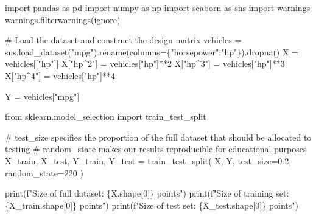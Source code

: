 \documentclass[
  letterpaper,
  DIV=11,
  numbers=noendperiod]{scrreprt}
\newenvironment{Shaded}{\begin{snugshade}}{\end{snugshade}}
\newcommand{\BuiltInTok}[1]{\textcolor[rgb]{0.00,0.23,0.31}{#1}}
\newcommand{\CommentTok}[1]{\textcolor[rgb]{0.37,0.37,0.37}{#1}}
\newcommand{\DecValTok}[1]{\textcolor[rgb]{0.68,0.00,0.00}{#1}}
\newcommand{\FloatTok}[1]{\textcolor[rgb]{0.68,0.00,0.00}{#1}}
\newcommand{\ImportTok}[1]{\textcolor[rgb]{0.00,0.46,0.62}{#1}}
\newcommand{\NormalTok}[1]{\textcolor[rgb]{0.00,0.23,0.31}{#1}}
\newcommand{\OperatorTok}[1]{\textcolor[rgb]{0.37,0.37,0.37}{#1}}
\newcommand{\SpecialCharTok}[1]{\textcolor[rgb]{0.37,0.37,0.37}{#1}}
\newcommand{\SpecialStringTok}[1]{\textcolor[rgb]{0.13,0.47,0.30}{#1}}
\newcommand{\StringTok}[1]{\textcolor[rgb]{0.13,0.47,0.30}{#1}}
\begin{document}
\begin{Shaded}
\begin{Highlighting}[]
\ImportTok{import}\NormalTok{ pandas }\ImportTok{as}\NormalTok{ pd}
\ImportTok{import}\NormalTok{ numpy }\ImportTok{as}\NormalTok{ np}
\ImportTok{import}\NormalTok{ seaborn }\ImportTok{as}\NormalTok{ sns}
\ImportTok{import}\NormalTok{ warnings}
\NormalTok{warnings.filterwarnings(}\StringTok{\textquotesingle{}ignore\textquotesingle{}}\NormalTok{)}

\CommentTok{\# Load the dataset and construct the design matrix}
\NormalTok{vehicles }\OperatorTok{=}\NormalTok{ sns.load\_dataset(}\StringTok{"mpg"}\NormalTok{).rename(columns}\OperatorTok{=}\NormalTok{\{}\StringTok{"horsepower"}\NormalTok{:}\StringTok{"hp"}\NormalTok{\}).dropna()}
\NormalTok{X }\OperatorTok{=}\NormalTok{ vehicles[[}\StringTok{"hp"}\NormalTok{]]}
\NormalTok{X[}\StringTok{"hp\^{}2"}\NormalTok{] }\OperatorTok{=}\NormalTok{ vehicles[}\StringTok{"hp"}\NormalTok{]}\OperatorTok{**}\DecValTok{2}
\NormalTok{X[}\StringTok{"hp\^{}3"}\NormalTok{] }\OperatorTok{=}\NormalTok{ vehicles[}\StringTok{"hp"}\NormalTok{]}\OperatorTok{**}\DecValTok{3}
\NormalTok{X[}\StringTok{"hp\^{}4"}\NormalTok{] }\OperatorTok{=}\NormalTok{ vehicles[}\StringTok{"hp"}\NormalTok{]}\OperatorTok{**}\DecValTok{4}

\NormalTok{Y }\OperatorTok{=}\NormalTok{ vehicles[}\StringTok{"mpg"}\NormalTok{]}
\end{Highlighting}
\end{Shaded}

\begin{Shaded}
\begin{Highlighting}[]
\ImportTok{from}\NormalTok{ sklearn.model\_selection }\ImportTok{import}\NormalTok{ train\_test\_split}

\CommentTok{\# \textasciigrave{}test\_size\textasciigrave{} specifies the proportion of the full dataset that should be allocated to testing}
\CommentTok{\# \textasciigrave{}random\_state\textasciigrave{} makes our results reproducible for educational purposes}
\NormalTok{X\_train, X\_test, Y\_train, Y\_test }\OperatorTok{=}\NormalTok{ train\_test\_split(}
\NormalTok{        X, }
\NormalTok{        Y, }
\NormalTok{        test\_size}\OperatorTok{=}\FloatTok{0.2}\NormalTok{, }
\NormalTok{        random\_state}\OperatorTok{=}\DecValTok{220}
\NormalTok{    )}

\BuiltInTok{print}\NormalTok{(}\SpecialStringTok{f"Size of full dataset: }\SpecialCharTok{\{}\NormalTok{X}\SpecialCharTok{.}\NormalTok{shape[}\DecValTok{0}\NormalTok{]}\SpecialCharTok{\}}\SpecialStringTok{ points"}\NormalTok{)}
\BuiltInTok{print}\NormalTok{(}\SpecialStringTok{f"Size of training set: }\SpecialCharTok{\{}\NormalTok{X\_train}\SpecialCharTok{.}\NormalTok{shape[}\DecValTok{0}\NormalTok{]}\SpecialCharTok{\}}\SpecialStringTok{ points"}\NormalTok{)}
\BuiltInTok{print}\NormalTok{(}\SpecialStringTok{f"Size of test set: }\SpecialCharTok{\{}\NormalTok{X\_test}\SpecialCharTok{.}\NormalTok{shape[}\DecValTok{0}\NormalTok{]}\SpecialCharTok{\}}\SpecialStringTok{ points"}\NormalTok{)}
\end{Highlighting}
\end{Shaded}
\end{document}
